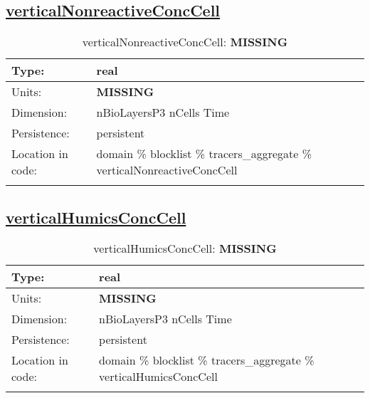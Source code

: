 \subsection[verticalNonreactiveConcCell]{\hyperref[sec:var_tab_tracers_aggregate]{verticalNonreactiveConcCell}}
\label{subsec:var_sec_tracers_aggregate_verticalNonreactiveConcCell}
\begin{center}
\begin{longtable}{| p{2.0in} | p{4.0in} |}
        \hline 
        Type: & real \\
        \hline 
        Units: & {\bf \color{red} MISSING} \\
        \hline 
        Dimension: & nBioLayersP3 nCells Time \\
        \hline 
        Persistence: & persistent \\
        \hline 
         Location in code: & domain \% blocklist \% tracers\_aggregate \% verticalNonreactiveConcCell \\
         \hline 
    \caption{verticalNonreactiveConcCell: {\bf \color{red} MISSING}}
\end{longtable}
\end{center}
\subsection[verticalHumicsConcCell]{\hyperref[sec:var_tab_tracers_aggregate]{verticalHumicsConcCell}}
\label{subsec:var_sec_tracers_aggregate_verticalHumicsConcCell}
\begin{center}
\begin{longtable}{| p{2.0in} | p{4.0in} |}
        \hline 
        Type: & real \\
        \hline 
        Units: & {\bf \color{red} MISSING} \\
        \hline 
        Dimension: & nBioLayersP3 nCells Time \\
        \hline 
        Persistence: & persistent \\
        \hline 
         Location in code: & domain \% blocklist \% tracers\_aggregate \% verticalHumicsConcCell \\
         \hline 
    \caption{verticalHumicsConcCell: {\bf \color{red} MISSING}}
\end{longtable}
\end{center}
